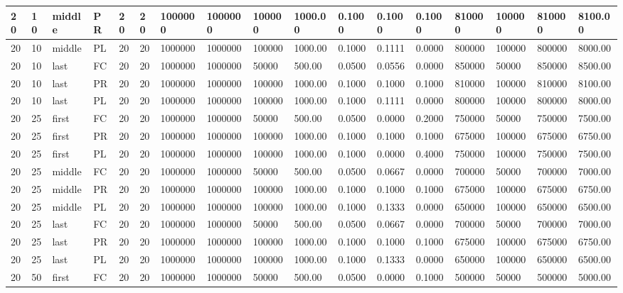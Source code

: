 \begin{tabular}{|l|l|l|l|l|l|l|l|l|l|l|l|l|l|l|l|l|}
20 & 10 & middle & PR & 20 & 20 & 1000000 & 1000000 & 100000 & 1000.00 & 0.1000 & 0.1000 & 0.1000 & 810000 & 100000 & 810000 & 8100.00 \\ \hline
20 & 10 & middle & PL & 20 & 20 & 1000000 & 1000000 & 100000 & 1000.00 & 0.1000 & 0.1111 & 0.0000 & 800000 & 100000 & 800000 & 8000.00 \\ \hline
20 & 10 & last & FC & 20 & 20 & 1000000 & 1000000 & 50000 & 500.00 & 0.0500 & 0.0556 & 0.0000 & 850000 & 50000 & 850000 & 8500.00 \\ \hline
20 & 10 & last & PR & 20 & 20 & 1000000 & 1000000 & 100000 & 1000.00 & 0.1000 & 0.1000 & 0.1000 & 810000 & 100000 & 810000 & 8100.00 \\ \hline
20 & 10 & last & PL & 20 & 20 & 1000000 & 1000000 & 100000 & 1000.00 & 0.1000 & 0.1111 & 0.0000 & 800000 & 100000 & 800000 & 8000.00 \\ \hline
20 & 25 & first & FC & 20 & 20 & 1000000 & 1000000 & 50000 & 500.00 & 0.0500 & 0.0000 & 0.2000 & 750000 & 50000 & 750000 & 7500.00 \\ \hline
20 & 25 & first & PR & 20 & 20 & 1000000 & 1000000 & 100000 & 1000.00 & 0.1000 & 0.1000 & 0.1000 & 675000 & 100000 & 675000 & 6750.00 \\ \hline
20 & 25 & first & PL & 20 & 20 & 1000000 & 1000000 & 100000 & 1000.00 & 0.1000 & 0.0000 & 0.4000 & 750000 & 100000 & 750000 & 7500.00 \\ \hline
20 & 25 & middle & FC & 20 & 20 & 1000000 & 1000000 & 50000 & 500.00 & 0.0500 & 0.0667 & 0.0000 & 700000 & 50000 & 700000 & 7000.00 \\ \hline
20 & 25 & middle & PR & 20 & 20 & 1000000 & 1000000 & 100000 & 1000.00 & 0.1000 & 0.1000 & 0.1000 & 675000 & 100000 & 675000 & 6750.00 \\ \hline
20 & 25 & middle & PL & 20 & 20 & 1000000 & 1000000 & 100000 & 1000.00 & 0.1000 & 0.1333 & 0.0000 & 650000 & 100000 & 650000 & 6500.00 \\ \hline
20 & 25 & last & FC & 20 & 20 & 1000000 & 1000000 & 50000 & 500.00 & 0.0500 & 0.0667 & 0.0000 & 700000 & 50000 & 700000 & 7000.00 \\ \hline
20 & 25 & last & PR & 20 & 20 & 1000000 & 1000000 & 100000 & 1000.00 & 0.1000 & 0.1000 & 0.1000 & 675000 & 100000 & 675000 & 6750.00 \\ \hline
20 & 25 & last & PL & 20 & 20 & 1000000 & 1000000 & 100000 & 1000.00 & 0.1000 & 0.1333 & 0.0000 & 650000 & 100000 & 650000 & 6500.00 \\ \hline
20 & 50 & first & FC & 20 & 20 & 1000000 & 1000000 & 50000 & 500.00 & 0.0500 & 0.0000 & 0.1000 & 500000 & 50000 & 500000 & 5000.00 \\ \hline

\end{tabular}
